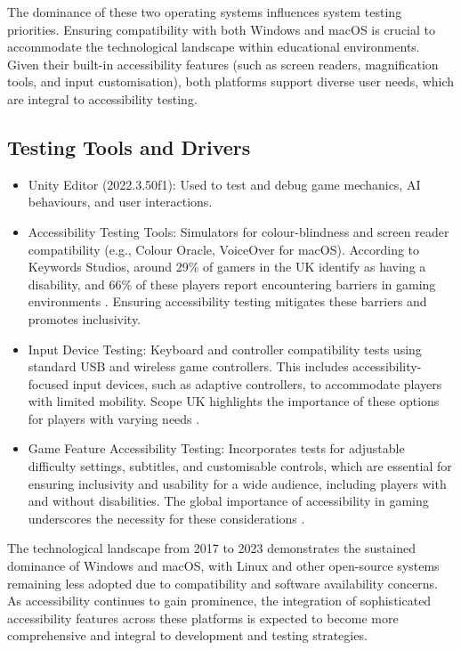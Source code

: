 \documentclass[11pt, a4paper]{article}
\begin{document}
The dominance of these two operating systems influences system testing priorities. Ensuring compatibility with both Windows and macOS is crucial to accommodate the technological landscape within educational environments. Given their built-in accessibility features (such as screen readers, magnification tools, and input customisation), both platforms support diverse user needs, which are integral to accessibility testing.

\subsection{Testing Tools and Drivers}

\begin{itemize}
    \item Unity Editor (2022.3.50f1): Used to test and debug game mechanics, AI behaviours, and user interactions.
    \item Accessibility Testing Tools: Simulators for colour-blindness and screen reader compatibility (e.g., Colour Oracle, VoiceOver for macOS). According to Keywords Studios, around 29\% of gamers in the UK identify as having a disability, and 66\% of these players report encountering barriers in gaming environments \cite{keywordsstudios}. Ensuring accessibility testing mitigates these barriers and promotes inclusivity.
    \item Input Device Testing: Keyboard and controller compatibility tests using standard USB and wireless game controllers. This includes accessibility-focused input devices, such as adaptive controllers, to accommodate players with limited mobility. Scope UK highlights the importance of these options for players with varying needs \cite{scope}.
    \item Game Feature Accessibility Testing: Incorporates tests for adjustable difficulty settings, subtitles, and customisable controls, which are essential for ensuring inclusivity and usability for a wide audience, including players with and without disabilities. The global importance of accessibility in gaming underscores the necessity for these considerations \cite{keywordsstudios}.
\end{itemize}

The technological landscape from 2017 to 2023 demonstrates the sustained dominance of Windows and macOS, with Linux and other open-source systems remaining less adopted due to compatibility and software availability concerns. As accessibility continues to gain prominence, the integration of sophisticated accessibility features across these platforms is expected to become more comprehensive and integral to development and testing strategies.
\end{document}
